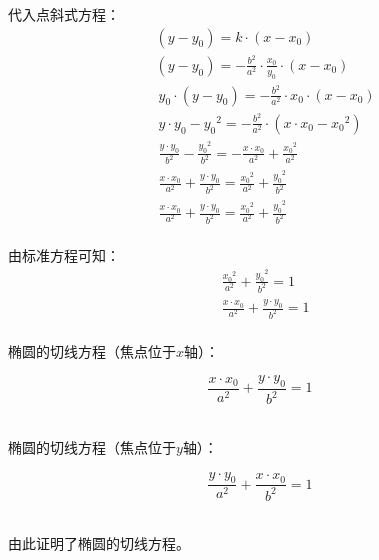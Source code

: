 \documentclass[UTF8]{ctexart}
\begin{document}
\newpage

    代入点斜式方程：
    \begin{align}
        &(y-y_0)=k\cdot(x-x_0)\\[5mm]
        &(y-y_0)=-\frac{b^2}{a^2}\cdot\frac{x_0}{y_0}\cdot(x-x_0)\\[5mm]
        &~y_0\cdot(y-y_0)=-\frac{b^2}{a^2}\cdot x_0\cdot(x-x_0)\\[5mm]
        &~y\cdot y_0-{y_0}^2=-\frac{b^2}{a^2}\cdot(x\cdot x_0-{x_0}^2)\\[5mm]
        &~\frac{y\cdot y_0}{b^2}-\frac{{y_0}^2}{b^2}=-\frac{x\cdot x_0}{a^2}+\frac{{x_0}^2}{a^2}\\[5mm]
        &~\frac{x\cdot x_0}{a^2}+\frac{y\cdot y_0}{b^2}=\frac{{x_0}^2}{a^2}+\frac{{y_0}^2}{b^2}\\[5mm]
        &~\frac{x\cdot x_0}{a^2}+\frac{y\cdot y_0}{b^2}=\frac{{x_0}^2}{a^2}+\frac{{y_0}^2}{b^2}
    \end{align}\\
    由标准方程可知：
    \begin{align}
        &\frac{{x_0}^2}{a^2}+\frac{{y_0}^2}{b^2}=1\\[5mm]
        &\frac{x\cdot x_0}{a^2}+\frac{y\cdot y_0}{b^2}=1
    \end{align}\\
    椭圆的切线方程（焦点位于$x$轴）：
    \begin{large}
        \begin{equation*}
            \frac{x \cdot x_0}{a^2}+\frac{y \cdot y_0}{b^2}=1
        \end{equation*}
    \end{large}\\
    椭圆的切线方程（焦点位于$y$轴）：
    \begin{large}
        \begin{equation*}
            \frac{y \cdot y_0}{a^2}+\frac{x \cdot x_0}{b^2}=1
        \end{equation*}
    \end{large}\\
    由此证明了椭圆的切线方程。

\newpage
\end{document}
